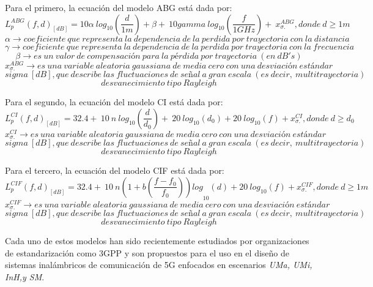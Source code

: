 \begin{flushleft}
 Para el primero, la ecuación del modelo ABG está dada por:
 \begin{equation}
    L^{ABG}_p(f,d)_{\left[dB\right]}=10 \alpha {\ log}_{10}\left(\frac{d}{1m}\right)+\beta +\ 10gamma {\ log}_{10}\left(\frac{f}{1GHz}\right)+\ x^{ABG}_{\sigma .}, donde\ d\ge 1m
    \label{eqn:ABG}
\end{equation}
\[\alpha \to coeficiente\ que\ representa\ la\ dependencia\ de\ la\ perdida\ por\ trayectoria\ con\ la\ distancia\] 
\[\gamma \to coeficiente\ que\ representa\ la\ dependencia\ de\ la\ perdida\ por\ trayectoria\ con\ la\ frecuencia\] 
\[\beta \to es\ un\ valor\ de\ compensación\ para\ la\ pérdida\ por\ trayectoria\ (en\ dB's)\] 
\[x^{ABG}_{\sigma .}\to es\ una\ variable\ aleatoria\ gaussiana\ de\ media\ cero\ con\ una\ desviaci\textrm{ó}n\ est\textrm{á}ndar \]
\[sigma \ [dB], que\ describe\ las\ fluctuaciones\ de\ se\textrm{ñ}al\ a\ gran\ escala\ (es\ decir,\ multitrayectoria)\]
\[desvanecimiento\ tipo\ Rayleigh \] 

Para el segundo, la ecuación del modelo CI está dada por:
\begin{equation}
    L^{CI}_p(f,d)_{\left[dB\right]}=32.4+\ 10\ n{\ log}_{10}\left(\frac{d}{d_0}\right)+{\ 20\ log}_{10}\left(d_0\right)+{20\ log}_{10}\left(f\right)+x^{CI}_{\sigma .}, donde\ d\ge d_0
    \label{eqn:CI}
\end{equation}
\[x^{CI}_{\sigma .}\to es\ una\ variable\ aleatoria\ gaussiana\ de\ media\ cero\ con\ una\ desviaci\textrm{ó}n\ est\textrm{á}ndar \]
\[sigma \ [dB], que\ describe\ las\ fluctuaciones\ de\ se\textrm{ñ}al\ a\ gran\ escala\ (es\ decir,\ multitrayectoria)\]
\[desvanecimiento\ tipo\ Rayleigh\] 

Para el tercero, la ecuación del modelo CIF está dada por:
\begin{equation}
    L^{CIF}_p(f,d)_{\left[dB\right]}=32.4+\ 10\ n{\left(1+b \left(\frac{f-f_0}{f_0}\right) \right)log}_{10}\left(d\right)+{20\ log}_{10}\left(f\right)+x^{CIF}_{\sigma .},  donde\ d\ge 1m
    \label{eqn:CIF}
\end{equation}
\[x^{CIF}_{\sigma .}\to es\ una\ variable\ aleatoria\ gaussiana\ de\ media\ cero\ con\ una\ desviaci\textrm{ó}n\ est\textrm{á}ndar  \]
\[ sigma \ [dB], que\ describe\ las\ fluctuaciones\ de\ se\textrm{ñ}al\ a\ gran\ escala\ (es\ decir,\ multitrayectoria)\]
\[desvanecimiento\ tipo\ Rayleigh\]
\end{flushleft}

Cada uno de estos modelos han sido recientemente estudiados por organizaciones de estandarización como 3GPP y son propuestos para el uso en el diseño de sistemas inalámbricos de comunicación de 5G enfocados en escenarios \textit{UMa, UMi, InH,y SM}.\newline

